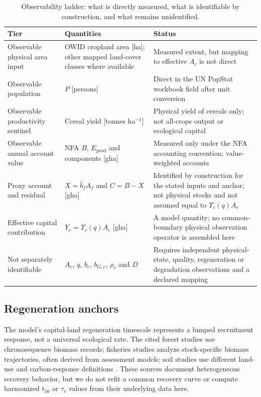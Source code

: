 \documentclass[11pt,a4paper]{article}
\newcommand{\Ups}{\Upsilon_c}
\begin{document}
\begin{table}[htbp]
\centering\small
\caption{Observability ladder: what is directly measured, what is identifiable by construction, and what remains unidentified.}
\label{tab:si_ladder}
\begin{tabularx}{\textwidth}{>{\raggedright\arraybackslash}p{} X >{\raggedright\arraybackslash}p{}}
\toprule
Tier & Quantities & Status \\
\midrule
Observable physical area input & OWID cropland area [ha]; other mapped land-cover classes where available & Measured extent, but mapping to effective $A_c$ is not direct \\
Observable population & $P$ [persons] & Direct in the UN PopStat workbook field after unit conversion \\
Observable productivity sentinel & Cereal yield [tonnes ha$^{-1}$] & Physical yield of cereals only; not all-crops output or ecological capital \\
Observable annual account value & NFA $B$, $E_{\mathrm{prod}}$ and components [gha] & Measured only under the NFA accounting convention; value-weighted accounts \\
Proxy account and residual & $X=\hat b_fA_f$ and $C=B-X$ [gha] & Identified by construction for the stated inputs and anchor; not physical stocks and not assumed equal to $\Ups(q)A_c$ \\
Effective capital contribution & $Y_c=\Ups(q)A_c$ [gha] & A model quantity; no common-boundary physical observation operator is assembled here \\
Not separately identifiable & $A_c$, $q$, $b_c$, $b_{G,c}$, $\rho_c$ and $D$ & Requires independent physical-state, quality, regeneration or degradation observations and a declared mapping \\
\bottomrule
\end{tabularx}
\end{table}

\subsection{Regeneration anchors}\label{si:anchors}

The model's capital-land regeneration timescale represents a lumped recruitment response, not a universal ecological rate. The cited forest studies use chronosequence biomass records; fisheries studies analyze stock-specific biomass trajectories, often derived from assessment models; soil studies use different land-use and carbon-response definitions \citep{Poorter2016,HutchingsReynolds2004,Neubauer2013,Poeplau2011}. These sources document heterogeneous recovery behavior, but we do not refit a common recovery curve or compute harmonized $t_{50}$ or $\tau_r$ values from their underlying data here.
\end{document}

